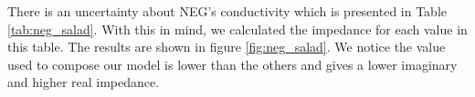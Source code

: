 
There is an uncertainty about NEG's conductivity which is presented in Table \ref{tab:neg_salad}. With this in mind, we calculated the impedance for each value in this table. The results are shown in figure \ref{fig:neg_salad}. We notice the value used to compose our model is lower than the others and gives a lower imaginary and higher real impedance.

